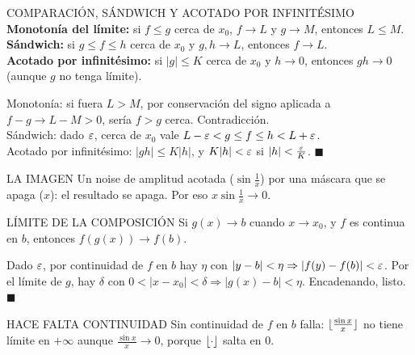 \agregado
\begin{sello}{COMPARACIÓN, SÁNDWICH Y ACOTADO POR INFINITÉSIMO}
\textbf{Monotonía del límite:} si $f\le g$ cerca de $x_0$, $f\to L$ y $g\to M$, entonces $L\le M$.\\[2pt]
\textbf{Sándwich:} si $g\le f\le h$ cerca de $x_0$ y $g,h\to L$, entonces $f\to L$.\\[2pt]
\textbf{Acotado por infinitésimo:} si $|g|\le K$ cerca de $x_0$ y $h\to0$, entonces $gh\to0$ (aunque $g$ no tenga límite).
\end{sello}
\begin{demo}
Monotonía: si fuera $L>M$, por conservación del signo aplicada a $f-g\to L-M>0$, sería $f>g$ cerca. Contradicción.\\[2pt]
Sándwich: dado $\varepsilon$, cerca de $x_0$ vale $L-\varepsilon<g\le f\le h<L+\varepsilon$.\\[2pt]
Acotado por infinitésimo: $|gh|\le K|h|$, y $K|h|<\varepsilon$ si $|h|<\frac{\varepsilon} K$. $\blacksquare$
\end{demo}
\begin{tip}{LA IMAGEN}
Un noise de amplitud acotada ($\sin\frac1x$) por una máscara que se apaga ($x$): el resultado se apaga. Por eso $x\sin\frac1x\to0$.
\end{tip}

\agregado
\begin{sello}{LÍMITE DE LA COMPOSICIÓN}
Si $g(x)\to b$ cuando $x\to x_0$, y $f$ es continua en $b$, entonces $f(g(x))\to f(b)$.
\end{sello}
\begin{demo}
Dado $\varepsilon$, por continuidad de $f$ en $b$ hay $\eta$ con $|y-b|<\eta\Rightarrow|f(y)-f(b)|<\varepsilon$. Por el límite de $g$, hay $\delta$ con $0<|x-x_0|<\delta\Rightarrow|g(x)-b|<\eta$. Encadenando, listo. $\blacksquare$
\end{demo}
\begin{trampa}{HACE FALTA CONTINUIDAD}
Sin continuidad de $f$ en $b$ falla: $\lfloor \frac{\sin x}x\rfloor$ no tiene límite en $+\infty$ aunque $\frac{\sin x}x\to0$, porque $\lfloor \cdot\rfloor$ salta en 0.
\end{trampa}


